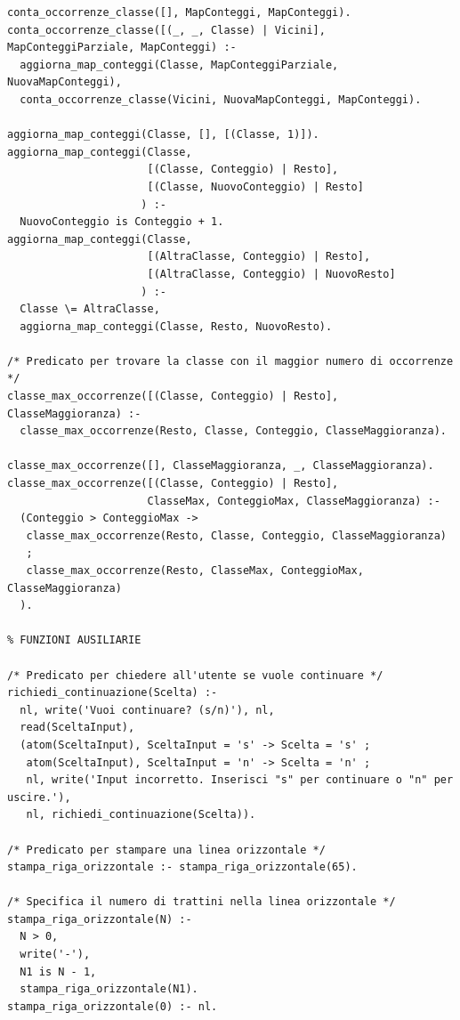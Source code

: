\documentclass[11pt]{article}
\theoremstyle{definition}
\begin{document}
\begin{verbatim}
conta_occorrenze_classe([], MapConteggi, MapConteggi).
conta_occorrenze_classe([(_, _, Classe) | Vicini], MapConteggiParziale, MapConteggi) :-
  aggiorna_map_conteggi(Classe, MapConteggiParziale, NuovaMapConteggi),
  conta_occorrenze_classe(Vicini, NuovaMapConteggi, MapConteggi).

aggiorna_map_conteggi(Classe, [], [(Classe, 1)]).
aggiorna_map_conteggi(Classe, 
                      [(Classe, Conteggio) | Resto], 
                      [(Classe, NuovoConteggio) | Resto]
                     ) :-
  NuovoConteggio is Conteggio + 1.
aggiorna_map_conteggi(Classe, 
                      [(AltraClasse, Conteggio) | Resto], 
                      [(AltraClasse, Conteggio) | NuovoResto]
                     ) :-
  Classe \= AltraClasse,
  aggiorna_map_conteggi(Classe, Resto, NuovoResto).

/* Predicato per trovare la classe con il maggior numero di occorrenze */
classe_max_occorrenze([(Classe, Conteggio) | Resto], ClasseMaggioranza) :-
  classe_max_occorrenze(Resto, Classe, Conteggio, ClasseMaggioranza).

classe_max_occorrenze([], ClasseMaggioranza, _, ClasseMaggioranza).
classe_max_occorrenze([(Classe, Conteggio) | Resto], 
                      ClasseMax, ConteggioMax, ClasseMaggioranza) :-
  (Conteggio > ConteggioMax ->
   classe_max_occorrenze(Resto, Classe, Conteggio, ClasseMaggioranza)
   ;  
   classe_max_occorrenze(Resto, ClasseMax, ConteggioMax, ClasseMaggioranza)
  ).
	
% FUNZIONI AUSILIARIE	
	
/* Predicato per chiedere all'utente se vuole continuare */
richiedi_continuazione(Scelta) :-
  nl, write('Vuoi continuare? (s/n)'), nl,
  read(SceltaInput),
  (atom(SceltaInput), SceltaInput = 's' -> Scelta = 's' ;
   atom(SceltaInput), SceltaInput = 'n' -> Scelta = 'n' ;
   nl, write('Input incorretto. Inserisci "s" per continuare o "n" per uscire.'), 
   nl, richiedi_continuazione(Scelta)).

/* Predicato per stampare una linea orizzontale */
stampa_riga_orizzontale :- stampa_riga_orizzontale(65).

/* Specifica il numero di trattini nella linea orizzontale */
stampa_riga_orizzontale(N) :- 
  N > 0, 
  write('-'), 
  N1 is N - 1, 
  stampa_riga_orizzontale(N1).
stampa_riga_orizzontale(0) :- nl.
\end{verbatim}

\newpage
\end{document}
